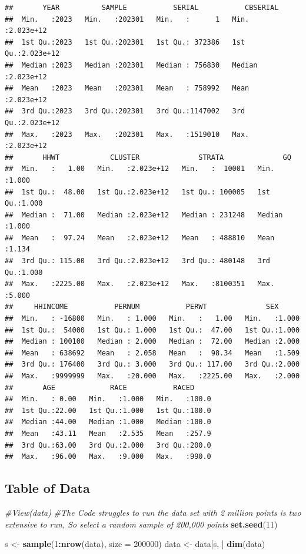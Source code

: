 \documentclass[
]{article}
\newenvironment{Shaded}{\begin{snugshade}}{\end{snugshade}}
\newcommand{\AttributeTok}[1]{\textcolor[rgb]{0.13,0.29,0.53}{#1}}
\newcommand{\CommentTok}[1]{\textcolor[rgb]{0.56,0.35,0.01}{\textit{#1}}}
\newcommand{\DecValTok}[1]{\textcolor[rgb]{0.00,0.00,0.81}{#1}}
\newcommand{\FunctionTok}[1]{\textcolor[rgb]{0.13,0.29,0.53}{\textbf{#1}}}
\newcommand{\NormalTok}[1]{#1}
\newcommand{\OtherTok}[1]{\textcolor[rgb]{0.56,0.35,0.01}{#1}}
\newcommand{\SpecialCharTok}[1]{\textcolor[rgb]{0.81,0.36,0.00}{\textbf{#1}}}
\begin{document}
\begin{verbatim}
##       YEAR          SAMPLE           SERIAL           CBSERIAL        
##  Min.   :2023   Min.   :202301   Min.   :      1   Min.   :2.023e+12  
##  1st Qu.:2023   1st Qu.:202301   1st Qu.: 372386   1st Qu.:2.023e+12  
##  Median :2023   Median :202301   Median : 756830   Median :2.023e+12  
##  Mean   :2023   Mean   :202301   Mean   : 758992   Mean   :2.023e+12  
##  3rd Qu.:2023   3rd Qu.:202301   3rd Qu.:1147002   3rd Qu.:2.023e+12  
##  Max.   :2023   Max.   :202301   Max.   :1519010   Max.   :2.023e+12  
##       HHWT            CLUSTER              STRATA              GQ       
##  Min.   :   1.00   Min.   :2.023e+12   Min.   :  10001   Min.   :1.000  
##  1st Qu.:  48.00   1st Qu.:2.023e+12   1st Qu.: 100005   1st Qu.:1.000  
##  Median :  71.00   Median :2.023e+12   Median : 231248   Median :1.000  
##  Mean   :  97.24   Mean   :2.023e+12   Mean   : 488810   Mean   :1.134  
##  3rd Qu.: 115.00   3rd Qu.:2.023e+12   3rd Qu.: 480148   3rd Qu.:1.000  
##  Max.   :2225.00   Max.   :2.023e+12   Max.   :8100351   Max.   :5.000  
##     HHINCOME           PERNUM           PERWT              SEX       
##  Min.   : -16800   Min.   : 1.000   Min.   :   1.00   Min.   :1.000  
##  1st Qu.:  54000   1st Qu.: 1.000   1st Qu.:  47.00   1st Qu.:1.000  
##  Median : 100100   Median : 2.000   Median :  72.00   Median :2.000  
##  Mean   : 638692   Mean   : 2.058   Mean   :  98.34   Mean   :1.509  
##  3rd Qu.: 176400   3rd Qu.: 3.000   3rd Qu.: 117.00   3rd Qu.:2.000  
##  Max.   :9999999   Max.   :20.000   Max.   :2225.00   Max.   :2.000  
##       AGE             RACE           RACED      
##  Min.   : 0.00   Min.   :1.000   Min.   :100.0  
##  1st Qu.:22.00   1st Qu.:1.000   1st Qu.:100.0  
##  Median :44.00   Median :1.000   Median :100.0  
##  Mean   :43.11   Mean   :2.535   Mean   :257.9  
##  3rd Qu.:63.00   3rd Qu.:2.000   3rd Qu.:200.0  
##  Max.   :96.00   Max.   :9.000   Max.   :990.0
\end{verbatim}

\subsection{Table of Data}\label{table-of-data}

\begin{Shaded}
\begin{Highlighting}[]
\CommentTok{\#View(data)}
\CommentTok{\#The Code struggles to run the data set with 2 million points is two extensive to run, So select a random sample of 200,000 points}
\FunctionTok{set.seed}\NormalTok{(}\DecValTok{11}\NormalTok{)}

\NormalTok{s }\OtherTok{\textless{}{-}} \FunctionTok{sample}\NormalTok{(}\DecValTok{1}\SpecialCharTok{:}\FunctionTok{nrow}\NormalTok{(data), }\AttributeTok{size =} \DecValTok{200000}\NormalTok{)}
\NormalTok{data }\OtherTok{\textless{}{-}}\NormalTok{ data[s, ]}
\FunctionTok{dim}\NormalTok{(data)}
\end{Highlighting}
\end{Shaded}
\end{document}
